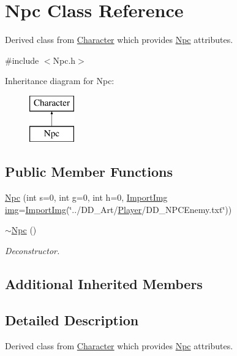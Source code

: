 \hypertarget{classNpc}{\section{Npc Class Reference}
\label{classNpc}
}


Derived class from \hyperlink{classCharacter}{Character} which provides \hyperlink{classNpc}{Npc} attributes.  




{\ttfamily \#include $<$Npc.\-h$>$}

Inheritance diagram for Npc\-:\begin{figure}[H]
\begin{center}
\leavevmode
\includegraphics[height=2.000000cm]{classNpc}
\end{center}
\end{figure}
\subsection*{Public Member Functions}
\begin{DoxyCompactItemize}
\item 
\hyperlink{classNpc_ad8de4e512338f57a56f490c60293118b}{Npc} (int s=0, int g=0, int h=0, \hyperlink{classImportImg}{Import\-Img} \hyperlink{classCharacter_a3a0a90b2a43858b259912f659b8e0eea}{img}=\hyperlink{classImportImg}{Import\-Img}(\char`\"{}../D\-D\-\_\-\-Art/\hyperlink{classPlayer}{Player}/D\-D\-\_\-\-N\-P\-C\-Enemy.\-txt\char`\"{}))
\item 
\hyperlink{classNpc_a2249c5155af3d692e51ff610064e81fe}{$\sim$\-Npc} ()
\begin{DoxyCompactList}\small\item\em Deconstructor. \end{DoxyCompactList}\end{DoxyCompactItemize}
\subsection*{Additional Inherited Members}


\subsection{Detailed Description}
Derived class from \hyperlink{classCharacter}{Character} which provides \hyperlink{classNpc}{Npc} attributes. 

